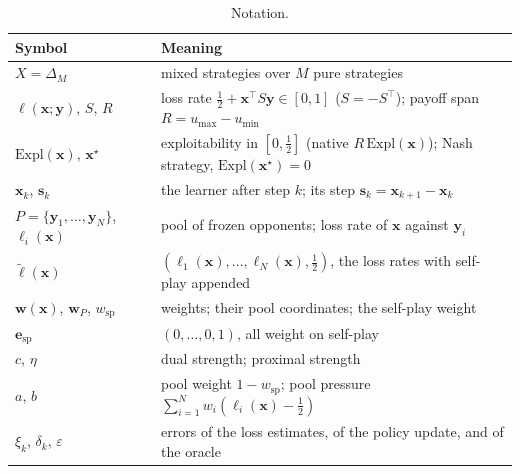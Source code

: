 \documentclass{article} %
\theoremstyle{plain}
\theoremstyle{remark}
\newcommand{\Expl}{\mathrm{Expl}}
\newcommand{\simplex}{\Delta}
\newcommand{\bx}{{\bm{x}}}
\newcommand{\by}{{\bm{y}}}
\newcommand{\bw}{{\bm{w}}}
\newcommand{\be}{{\bm{e}}}
\newcommand{\bell}{{\bm{\ell}}}
\newcommand{\aug}{\tilde{\bell}}
\newcommand{\xs}{\bx^{\star}}
\newcommand{\dx}{{\bm{s}}}
\newcommand{\esp}{\be_{\mathrm{sp}}}
\newcommand{\wsp}{w_{\mathrm{sp}}}
\begin{document}
\begin{table}[!htbp]
\caption{Notation.}
\label{tab:notation}
\begin{center}
\small
\begin{tabular}{ll}
\toprule
Symbol & Meaning \\
\midrule
$X=\simplex_M$ & mixed strategies over $M$ pure strategies \\
$\ell(\bx;\by)$, $S$, $R$ & loss rate $\tfrac12+\bx^\top S\by\in[0,1]$ ($S=-S^\top$); payoff span $R=u_{\max}-u_{\min}$ \\
$\Expl(\bx)$, $\xs$ & exploitability in $[0,\tfrac12]$ (native $R\,\Expl(\bx)$); Nash strategy, $\Expl(\xs)=0$ \\
$\bx_k$, $\dx_k$ & the learner after step $k$; its step $\dx_k=\bx_{k+1}-\bx_k$ \\
$P=\{\by_1,\dots,\by_N\}$, $\ell_i(\bx)$ & pool of frozen opponents; loss rate of $\bx$ against $\by_i$ \\
$\aug(\bx)$ & $(\ell_1(\bx),\dots,\ell_N(\bx),\tfrac12)$, the loss rates with self-play appended \\
$\bw(\bx)$, $\bw_P$, $\wsp$ & weights; their pool coordinates; the self-play weight \\
$\esp$ & $(0,\dots,0,1)$, all weight on self-play \\
$c$, $\eta$ & dual strength; proximal strength \\
$a$, $b$ & pool weight $1-\wsp$; pool pressure $\sum_{i=1}^Nw_i(\ell_i(\bx)-\tfrac12)$ \\
$\xi_k$, $\delta_k$, $\varepsilon$ & errors of the loss estimates, of the policy update, and of the oracle \\
\bottomrule
\end{tabular}
\end{center}
\end{table}
\end{document}
